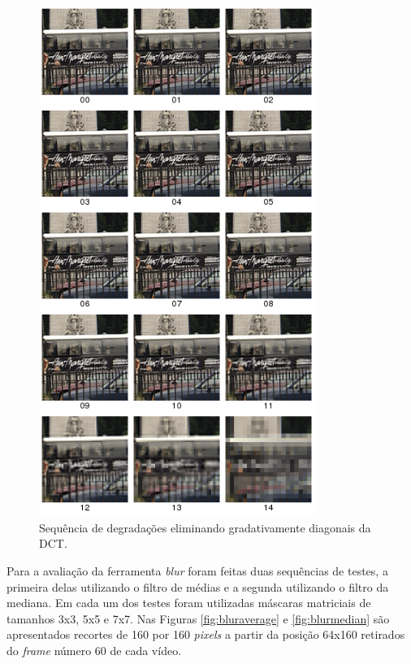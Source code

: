 \begin{figure}[!htb]
	\centering
	\includegraphics[width=0.8\textwidth]{./imgs/blockbus.png}
	\caption{Sequência de degradações eliminando gradativamente diagonais da DCT.}
	\label{fig:blockbus}
\end{figure}

Para a avaliação da ferramenta \emph{blur} foram feitas duas sequências de testes, a primeira delas utilizando o filtro de médias e a segunda utilizando o filtro da mediana.
Em cada um dos testes foram utilizadas máscaras matriciais de tamanhos 3x3, 5x5 e 7x7. Nas Figuras \ref{fig:bluraverage} e \ref{fig:blurmedian} são apresentados recortes de 160 por 160 \emph{pixels} a partir da posição 64x160 retirados do \emph{frame} número 60 de cada vídeo.

